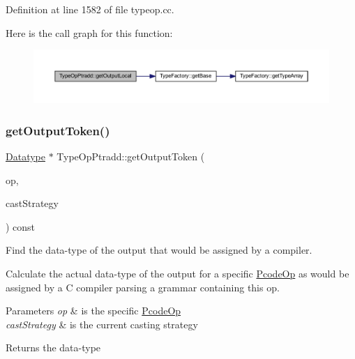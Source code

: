 Definition at line 1582 of file typeop.\+cc.

Here is the call graph for this function\+:
\nopagebreak
\begin{figure}[H]
\begin{center}
\leavevmode
\includegraphics[width=350pt]{class_type_op_ptradd_af8fe09a62086231038f5c181dc0d0a03_cgraph}
\end{center}
\end{figure}
\mbox{\label{class_type_op_ptradd_a129573eb45f5e95826e557032aa785a1}} 
\subsubsection{\texorpdfstring{getOutputToken()}{getOutputToken()}}
{\footnotesize\ttfamily \mbox{\hyperlink{class_datatype}{Datatype}} $\ast$ Type\+Op\+Ptradd\+::get\+Output\+Token (\begin{DoxyParamCaption}\item[{const \mbox{\hyperlink{class_pcode_op}{Pcode\+Op}} $\ast$}]{op,  }\item[{\mbox{\hyperlink{class_cast_strategy}{Cast\+Strategy}} $\ast$}]{cast\+Strategy }\end{DoxyParamCaption}) const\hspace{0.3cm}{\ttfamily [virtual]}}



Find the data-\/type of the output that would be assigned by a compiler. 

Calculate the actual data-\/type of the output for a specific \mbox{\hyperlink{class_pcode_op}{Pcode\+Op}} as would be assigned by a C compiler parsing a grammar containing this op. 
\begin{DoxyParams}{Parameters}
{\em op} & is the specific \mbox{\hyperlink{class_pcode_op}{Pcode\+Op}} \\
\hline
{\em cast\+Strategy} & is the current casting strategy \\
\hline
\end{DoxyParams}
\begin{DoxyReturn}{Returns}
the data-\/type 
\end{DoxyReturn}


